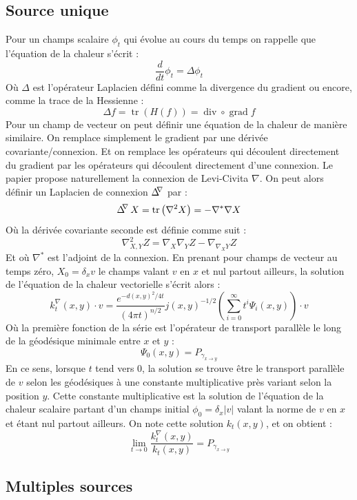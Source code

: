 \documentclass[11pt]{article}
\DeclareMathOperator{\trace}{tr}
\DeclareMathOperator{\grad}{grad}
\DeclareMathOperator{\divergence}{div}
\DeclareMathOperator{\connexionLaplacian}{\Delta^{\hspace{-3pt} \nabla}}
\begin{document}
	\subsection{Source unique}
	Pour un champs scalaire $\phi_t$ qui évolue au cours du temps on rappelle que l'équation de la chaleur s'écrit :
	$$ \frac{d}{dt} \phi_t = \Delta \phi_t $$
	Où $\Delta$ est l'opérateur Laplacien défini comme la divergence du gradient ou encore, comme la trace de la Hessienne :
	$$ \Delta f = \trace \left( H(f) \right) = \divergence \circ \grad f $$
	Pour un champ de vecteur on peut définir une équation de la chaleur de manière similaire. On remplace simplement le gradient par une dérivée covariante/connexion. Et on remplace les opérateurs qui découlent directement du gradient par les opérateurs qui découlent directement d'une connexion. Le papier propose naturellement la connexion de Levi-Civita $\nabla$. On peut alors définir un Laplacien de connexion $\connexionLaplacian$ par :
	$$ \connexionLaplacian X = \trace \left( \nabla^2 X \right) = - \nabla^* \nabla X $$
	Où la dérivée covariante seconde est définie comme suit :
	$$ \nabla^2_{X, Y} Z = \nabla_X \nabla_Y Z - \nabla_{\nabla_X Y} Z $$
	Et où $\nabla^*$ est l'adjoint de la connexion.
	En prenant pour champs de vecteur au temps zéro, $X_0 = \delta_x v$ le champs valant $v$ en $x$ et nul partout ailleurs, la solution de l'équation de la chaleur vectorielle s'écrit alors :
	$$ k_t^\nabla(x, y) \cdot v = \frac{e^{-d(x, y)^2 / 4t}}{(4 \pi t)^{n/2}} j(x, y)^{-1/2} \left( \sum_{i=0}^\infty t^i \Psi_i(x, y) \right) \cdot v $$
	Où la première fonction de la série est l'opérateur de transport parallèle le long de la géodésique minimale entre $x$ et $y$ :
	$$ \Psi_0(x, y) = P_{\gamma_{x \rightarrow y}} $$
	En ce sens, lorsque $t$ tend vers 0, la solution se trouve être le transport parallèle de $v$ selon les géodésiques à une constante multiplicative près variant selon la position $y$. Cette constante multiplicative est la solution de l'équation de la chaleur scalaire partant d'un champs initial $\phi_0 = \delta_x |v|$ valant la norme de $v$ en $x$ et étant nul partout ailleurs. On note cette solution $k_t(x, y)$, et on obtient :
	$$ \lim_{t \rightarrow 0} \frac{k_t^\nabla(x, y)}{k_t(x, y)} = P_{\gamma_{x \rightarrow y}} $$
	
	\subsection{Multiples sources}
	
\end{document}

